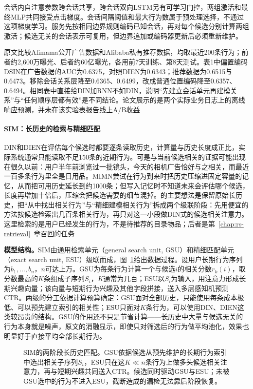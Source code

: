 会话内自注意参数跨会话共享，跨会话双向LSTM另有可学习门控，两组激活和最终MLP共同接受点击梯度。会话间隔阈值和最大行为数属于预处理选择，不通过这项梯度学习。服务先按相同边界规则编码已知会话，再对每个候选分别计算两组激活；候选无关的会话表示可复用，但边界追加或编码器更新后必须重新维护。

原文比较Alimama公开广告数据和Alibaba私有推荐数据，均取最近200条行为；前者约2,600万曝光、后者约60亿曝光，各用前7天训练、第8天测试。表1中偏置编码DSIN在广告数据的AUC为0.6375，对照DIEN为0.6343；推荐数据为0.6515与0.6473。移除会话关系层降至0.6365、0.6499，改成普通位置编码降至0.6357、0.6494。相同表中直接给DIN加RNN不如DIN，说明“先建立会话单元再建模关系”与“任何顺序层都有效”是不同结论。论文展示的是两个实际业务日志上的离线响应预测，并未在该实验表报告线上A/B收益

\paragraph{SIM：长历史的检索与精细匹配}
\label{sec:rs-sim}

DIN和DIEN在评估每个候选时都要逐条读取历史，计算量与历史长度成正比，实际系统通常只能读取不足150条的近期行为。可是与当前候选相关的证据可能出现在很久以前：用户半年前浏览过一批镜头，今天的相机广告恰好与之相关，而最近一百多条行为里全是日用品。MIMN尝试在行为到来时把历史压缩进固定容量的记忆，从而把可用历史延长到约1000条；但写入记忆时不知道未来会评估哪个候选，长度再增加十倍后，压缩会把候选需要的细节混掉。的主要想法是保留原始长历史，把“从中找出相关行为”与“精细建模相关行为”拆成两个级联阶段：先用便宜的方法按候选检索出几百条相关行为，再只对这一小段做DIN式的候选相关注意力。这里检索的是用户已经发生的行为，不是待推荐的目录物品；后者是第~\ref{chap:rs-retrieval}~章召回的任务

\textbf{模型结构。}SIM由通用检索单元（general search unit, GSU）和精细匹配单元（exact search unit, ESU）级联而成，图~\ref{fig:rs-sim-two-stage}给出数据过程。设用户长期行为序列为$b_1,\ldots,b_n$，$n$可达上万。GSU为每条行为计算一个与候选$i$的相关分数$r_k(i)$，取分数最高的$K$条组成子序列$S_i$，$K$通常为几百；ESU以$S_i$为输入，用注意力形成长期兴趣向量；该向量与短期行为兴趣及其他字段拼接，送入多层感知机预测CTR。两级的分工依据计算预算确定：GSU面对全部历史，只能使用每条成本极低、可以预先建立索引的相关性；ESU只面对$K$条行为，可以使用DIN、DIEN这类较昂贵的结构。GSU的作用还不只是节省计算——长历史中大量与候选无关的行为本身就是噪声，原文的消融显示，即使只对筛选后的行为做平均池化，效果也明显好于直接平均全部长期行为。

\begin{figure}[htbp]
  \centering
  
  \caption{SIM的两阶段长历史匹配。GSU依据候选从预先维护的长期行为索引中选出相关子序列$S_i$，ESU只在这$K\ll n$条行为上做多头候选相关注意力，再与短期兴趣共同送入CTR。候选同时驱动GSU与ESU；未被GSU选中的行为不进入ESU，截断造成的漏检无法靠后阶段恢复。}
  \label{fig:rs-sim-two-stage}
\end{figure}

